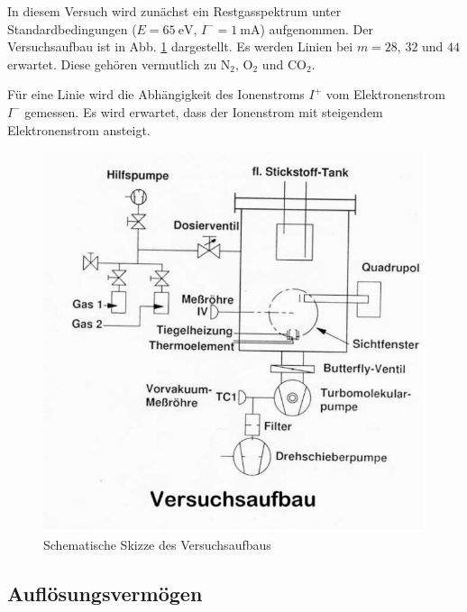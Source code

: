 In diesem Versuch wird zunächst ein Restgasspektrum unter Standardbedingungen ($E=\SI{65}{\electronvolt}, \, I^{-}=\SI{1}{\milli\ampere}$) aufgenommen. Der Versuchsaufbau ist in Abb. \ref{fig0v11} dargestellt.
Es werden Linien bei $m=28,\, 32$ und $44$ erwartet. Diese gehören vermutlich zu $\textrm{N}_{2}, \, \textrm{O}_{2}$ und $\textrm{CO}_{2}$.

Für eine Linie wird die Abhängigkeit des Ionenstroms $I^{+}$ vom Elektronenstrom $I^{-}$ gemessen. Es wird erwartet, dass der Ionenstrom mit steigendem Elektronenstrom ansteigt.

\begin{figure}[tb]
 \centering
 \includegraphics[scale=0.5]{./fig/massenspek_aufbau.png}
 \caption{Schematische Skizze des Versuchsaufbaus}
 \label{fig0v11}
\end{figure}

\subsection{Auflösungsvermögen}

